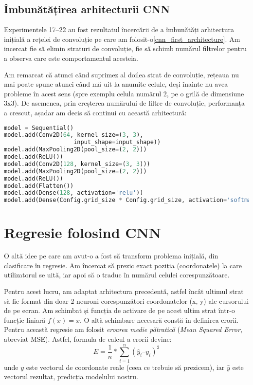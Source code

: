 \subsection{Îmbunătățirea arhitecturii CNN}

Experimentele 17–22 au fost rezultatul încercării de a îmbunătăți arhitectura inițială a rețelei de convoluție pe care am folosit-o\ref{cnn_first_architecture}.
Am incercat fie să elimin straturi de convoluție, fie să schimb numărul filtrelor pentru a observa care este comportamentul acesteia.


Am remarcat că atunci când suprimez al doilea strat de convoluție, rețeaua nu mai poate spune atunci când mă uit la anumite celule, deși înainte nu avea probleme în acest sens (spre exemplu celula numărul 2, pe o grilă de dimensiune 3x3).
De asemenea, prin creșterea numărului de filtre de convoluție, performanța a crescut, așadar am decis să continui cu această arhitectură:

\begin{lstlisting}[language=Python, caption=Arhitectura CNN îmbunătățită]
model = Sequential()
model.add(Conv2D(64, kernel_size=(3, 3),
                    input_shape=input_shape))
model.add(MaxPooling2D(pool_size=(2, 2)))
model.add(ReLU())
model.add(Conv2D(128, kernel_size=(3, 3)))
model.add(MaxPooling2D(pool_size=(2, 2)))
model.add(ReLU())
model.add(Flatten())
model.add(Dense(128, activation='relu'))
model.add(Dense(Config.grid_size * Config.grid_size, activation='softmax'))
\end{lstlisting}

\section{Regresie folosind CNN}

O altă idee pe care am avut-o a fost să transform problema inițială, din clasificare în regresie.
Am încercat să prezic exact poziția (coordonatele) la care utilizatorul se uită, iar apoi să o traduc în numărul celulei corespunzătoare.


Pentru acest lucru, am adaptat arhitectura precedentă, astfel încât ultimul strat să fie format din doar 2 neuroni corespunzători coordonatelor (x, y) ale cursorului de pe ecran.
Am schimbat și funcția de activare de pe acest ultim strat într-o funcție liniară $f(x)=x$.
O altă schimbare necesară constă în definirea erorii.
Pentru această regresie am folosit \emph{eroarea medie pătratică} (\emph{Mean Squared Error}, abreviat MSE).
Astfel, formula de calcul a erorii devine:
$$
E = \frac{1}{n} * \sum_{i=1}^{n}{(\hat{y}_{i} – y_i)^2}
$$
unde $y$ este vectorul de coordonate reale (ceea ce trebuie să prezicem), iar $\hat{y}$ este vectorul rezultat, predicția modelului nostru.


